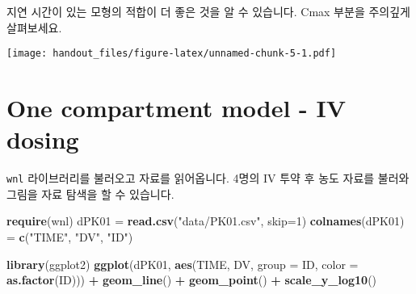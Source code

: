 \documentclass[9pt,]{krantz}
\newenvironment{Shaded}{\begin{snugshade}}{\end{snugshade}}
\newcommand{\KeywordTok}[1]{\textcolor[rgb]{0.13,0.29,0.53}{\textbf{#1}}}
\newcommand{\DataTypeTok}[1]{\textcolor[rgb]{0.13,0.29,0.53}{#1}}
\newcommand{\DecValTok}[1]{\textcolor[rgb]{0.00,0.00,0.81}{#1}}
\newcommand{\FloatTok}[1]{\textcolor[rgb]{0.00,0.00,0.81}{#1}}
\newcommand{\StringTok}[1]{\textcolor[rgb]{0.31,0.60,0.02}{#1}}
\newcommand{\CommentTok}[1]{\textcolor[rgb]{0.56,0.35,0.01}{\textit{#1}}}
\newcommand{\OperatorTok}[1]{\textcolor[rgb]{0.81,0.36,0.00}{\textbf{#1}}}
\newcommand{\NormalTok}[1]{#1}
\begin{document}
지연 시간이 있는 모형의 적합이 더 좋은 것을 알 수 있습니다. Cmax 부분을
주의깊게 살펴보세요.

\begin{Shaded}
\end{Shaded}

\texttt{[image: handout\_files/figure-latex/unnamed-chunk-5-1.pdf]}

\chapter{One compartment model - IV
dosing}\label{one-compartment-model---iv-dosing}

\texttt{wnl} 라이브러리를 불러오고 자료를 읽어옵니다. 4명의 IV 투약 후
농도 자료를 불러와 그림을 자료 탐색을 할 수 있습니다.

\begin{Shaded}
\begin{Highlighting}[]
\KeywordTok{require}\NormalTok{(wnl)}
\NormalTok{dPK01 =}\StringTok{ }\KeywordTok{read.csv}\NormalTok{(}\StringTok{"data/PK01.csv"}\NormalTok{, }\DataTypeTok{skip=}\DecValTok{1}\NormalTok{)}
\KeywordTok{colnames}\NormalTok{(dPK01) =}\StringTok{ }\KeywordTok{c}\NormalTok{(}\StringTok{"TIME"}\NormalTok{, }\StringTok{"DV"}\NormalTok{, }\StringTok{"ID"}\NormalTok{)}

\KeywordTok{library}\NormalTok{(ggplot2)}
\KeywordTok{ggplot}\NormalTok{(dPK01, }\KeywordTok{aes}\NormalTok{(TIME, DV, }\DataTypeTok{group =}\NormalTok{ ID, }\DataTypeTok{color =} \KeywordTok{as.factor}\NormalTok{(ID))) }\OperatorTok{+}
\StringTok{  }\KeywordTok{geom_line}\NormalTok{() }\OperatorTok{+}\StringTok{ }\KeywordTok{geom_point}\NormalTok{() }\OperatorTok{+}\StringTok{ }\KeywordTok{scale_y_log10}\NormalTok{()}
\end{Highlighting}
\end{Shaded}
\end{document}
